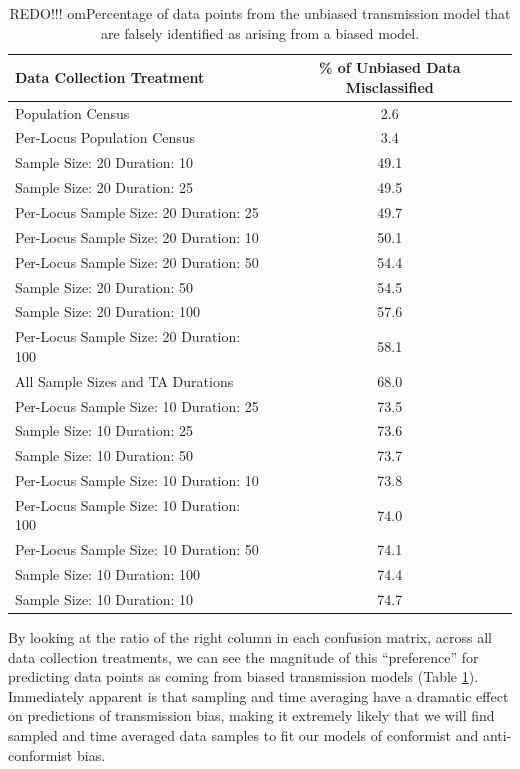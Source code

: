 \documentclass[10pt,letterpaper]{article}
\begin{document}
\begin{table}[ht]

\begin{tabular}{|l|c|}
  \hline
Data Collection Treatment & \% of Unbiased Data Misclassified \\
  \hline
Population Census & 2.6 \\
  Per-Locus Population Census & 3.4 \\
  Sample Size:  20  Duration:  10 & 49.1 \\
  Sample Size:  20  Duration:  25 & 49.5 \\
  Per-Locus Sample Size:  20  Duration:  25 & 49.7 \\
  Per-Locus Sample Size:  20  Duration:  10 & 50.1 \\
  Per-Locus Sample Size:  20  Duration:  50 & 54.4 \\
  Sample Size:  20  Duration:  50 & 54.5 \\
  Sample Size:  20  Duration:  100 & 57.6 \\
  Per-Locus Sample Size:  20  Duration:  100 & 58.1 \\
  All Sample Sizes and TA Durations & 68.0 \\
  Per-Locus Sample Size:  10  Duration:  25 & 73.5 \\
  Sample Size:  10  Duration:  25 & 73.6 \\
  Sample Size:  10  Duration:  50 & 73.7 \\
  Per-Locus Sample Size:  10  Duration:  10 & 73.8 \\
  Per-Locus Sample Size:  10  Duration:  100 & 74.0 \\
  Per-Locus Sample Size:  10  Duration:  50 & 74.1 \\
  Sample Size:  10  Duration:  100 & 74.4 \\
  Sample Size:  10  Duration:  10 & 74.7 \\
   \hline
\end{tabular}

    \caption{REDO!!!  omPercentage of data points from the unbiased transmission model that are falsely identified as arising from a biased model.}
    \label{tab:misclassification-neutral}
\end{table}

By looking at the ratio of the right column in each confusion matrix, across all data collection treatments, we can see the magnitude of this ``preference'' for predicting data points as coming from biased transmission models (Table \ref{tab:misclassification-neutral}).  Immediately apparent is that sampling and time averaging have a dramatic effect on predictions of transmission bias, making it extremely likely that we will find sampled and time averaged data samples to fit our models of conformist and anti-conformist bias.  
\end{document}
